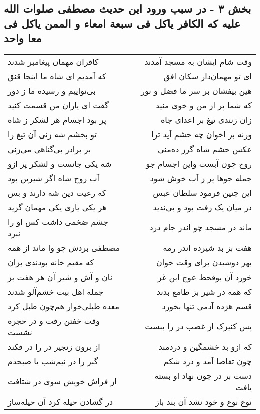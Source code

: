 \begin{center}
\section*{بخش ۳ - در سبب ورود این حدیث مصطفی صلوات الله علیه که الکافر یاکل فی سبعة امعاء و الممن یاکل فی معا واحد}
\label{sec:sh003}
\begin{longtable}{l p{0.5cm} r}
کافران مهمان پیغامبر شدند
&&
وقت شام ایشان به مسجد آمدند
\\
که آمدیم ای شاه ما اینجا قنق
&&
ای تو مهمان‌دار سکان افق
\\
بی‌نواییم و رسیده ما ز دور
&&
هین بیفشان بر سر ما فضل و نور
\\
گفت ای یاران من قسمت کنید
&&
که شما پر از من و خوی منید
\\
پر بود اجسام هر لشکر ز شاه
&&
زان زنندی تیغ بر اعدای جاه
\\
تو بخشم شه زنی آن تیغ را
&&
ورنه بر اخوان چه خشم آید ترا
\\
بر برادر بی‌گناهی می‌زنی
&&
عکس خشم شاه گرز ده‌منی
\\
شه یکی جانست و لشکر پر ازو
&&
روح چون آبست واین اجسام جو
\\
آب روح شاه اگر شیرین بود
&&
جمله جوها پر ز آب خوش شود
\\
که رعیت دین شه دارند و بس
&&
این چنین فرمود سلطان عبس
\\
هر یکی یاری یکی مهمان گزید
&&
در میان یک زفت بود و بی‌ندید
\\
جشم ضخمی داشت کس او را نبرد
&&
ماند در مسجد چو اندر جام درد
\\
مصطفی بردش چو وا ماند از همه
&&
هفت بز بد شیرده اندر رمه
\\
که مقیم خانه بودندی بزان
&&
بهر دوشیدن برای وقت خوان
\\
نان و آش و شیر آن هر هفت بز
&&
خورد آن بوقحط عوج ابن غز
\\
جمله اهل بیت خشم‌آلو شدند
&&
که همه در شیر بز طامع بدند
\\
معده طبلی‌خوار هم‌چون طبل کرد
&&
قسم هژده آدمی تنها بخورد
\\
وقت خفتن رفت و در حجره نشست
&&
پس کنیزک از غضب در را ببست
\\
از برون زنجیر در را در فکند
&&
که ازو بد خشمگین و دردمند
\\
گبر را در نیم‌شب یا صبحدم
&&
چون تقاضا آمد و درد شکم
\\
از فراش خویش سوی در شتافت
&&
دست بر در چون نهاد او بسته یافت
\\
در گشادن حیله کرد آن حیله‌ساز
&&
نوع نوع و خود نشد آن بند باز

\end{longtable}
\end{center}
